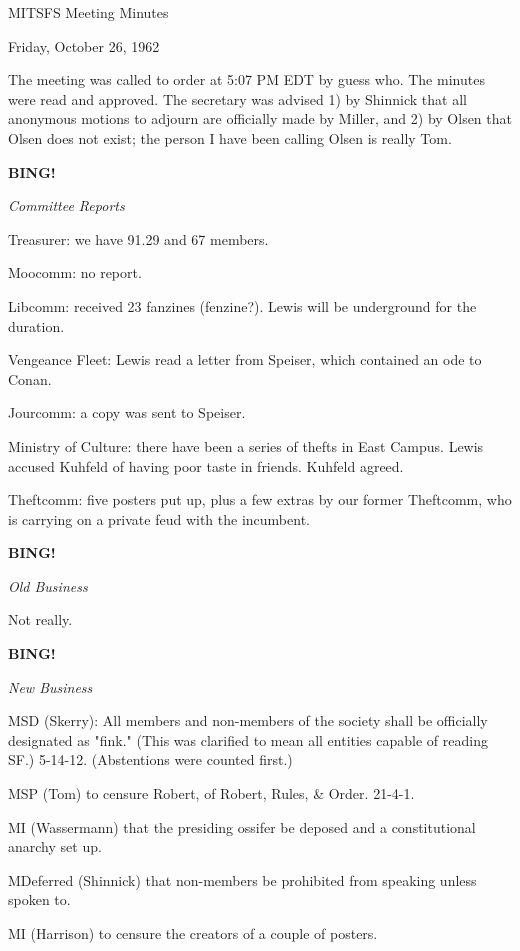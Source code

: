 \documentclass[12pt]{article}
\newcommand{\bing}{{\bf BING!} }
\newcommand{\goto}[1]{\bing \vskip 12pt \centerline{{\em{#1}}}}
\begin{document}
\begin{center}

MITSFS Meeting Minutes

Friday, October 26, 1962

\end{center}
 
\vspace{12pt}

\setlength{\parskip}{6pt}

\noindent
The meeting was called to order at 5:07 PM EDT by guess who. The minutes were read and approved. The secretary was advised 1) by Shinnick that all anonymous motions to adjourn are officially made by Miller, and 2) by Olsen that Olsen does not exist; the person I have been calling Olsen is really Tom.

\goto{Committee Reports}

Treasurer: we have 91.29 and 67 members.

Moocomm: no report.

Libcomm: received 23 fanzines (fenzine?). Lewis will be underground for the duration.

Vengeance Fleet: Lewis read a letter from Speiser, which contained an ode to Conan.

Jourcomm: a copy was sent to Speiser.

Ministry of Culture: there have been a series of thefts in East Campus. Lewis accused Kuhfeld of having poor taste in friends. Kuhfeld agreed.

Theftcomm: five posters put up, plus a few extras by our former Theftcomm, who is carrying on a private feud with the incumbent.

\goto{Old Business}

Not really.

\goto{New Business}

MSD (Skerry): All members and non-members of the society shall be officially designated as "fink." (This was clarified to mean all entities capable of reading SF.) 5-14-12. (Abstentions were counted first.)

MSP (Tom) to censure Robert, of Robert, Rules, & Order. 21-4-1.

MI (Wassermann) that the presiding ossifer be deposed and a constitutional anarchy set up.

MDeferred (Shinnick) that non-members be prohibited from speaking unless spoken to.

MI (Harrison) to censure the creators of a couple of posters.
\end{document}
